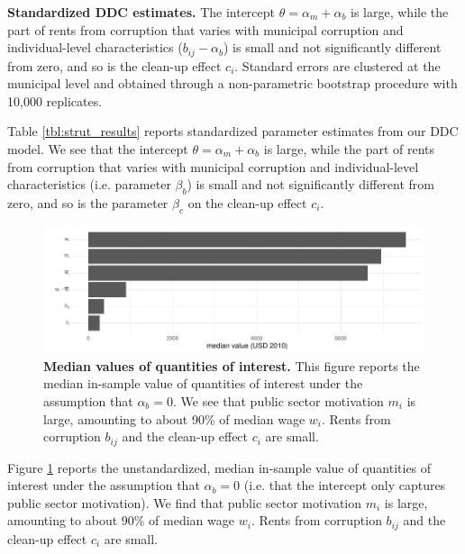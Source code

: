 {\begin{table}[h]
    \centering
    
    \caption{{\bf Standardized DDC estimates.} The intercept $\theta = \alpha_m + \alpha_b$ is large, while the part of rents from corruption that varies with municipal corruption and individual-level characteristics ($b_{ij} - \alpha_b$) is small and not significantly different from zero, and so is the clean-up effect $c_i$. Standard errors are clustered at the municipal level and obtained through a non-parametric bootstrap procedure with 10,000 replicates.}
    \label{tbl:strut_results}
\end{table}

Table \ref{tbl:strut_results} reports standardized parameter estimates from our DDC model. We see that the intercept $\theta = \alpha_m + \alpha_b$ is large, while the part of rents from corruption that varies with municipal corruption and individual-level characteristics (i.e. parameter $\beta_b$) is small and not significantly different from zero, and so is the parameter $\beta_c$ on the clean-up effect $c_i$. 

\begin{figure}[h]
    \centering
    \includegraphics{chapters/chapter_2/figures/distribStructural.pdf}
    \caption{{\bf Median values of quantities of interest.} This figure reports the median in-sample value of quantities of interest under the assumption that $\alpha_b = 0$. We see that public sector motivation $m_i$ is large, amounting to about 90\% of median wage $w_i$. Rents from corruption $b_{ij}$ and the clean-up effect $c_i$ are small.}
    \label{fig:mainResultStructural}
\end{figure}

Figure \ref{fig:mainResultStructural} reports the unstandardized, median in-sample value of quantities of interest under the assumption that $\alpha_b = 0$ (i.e. that the intercept only captures public sector motivation). We find that public sector motivation $m_i$ is large, amounting to about 90\% of median wage $w_i$. Rents from corruption $b_{ij}$ and the clean-up effect $c_i$ are small. 

}
